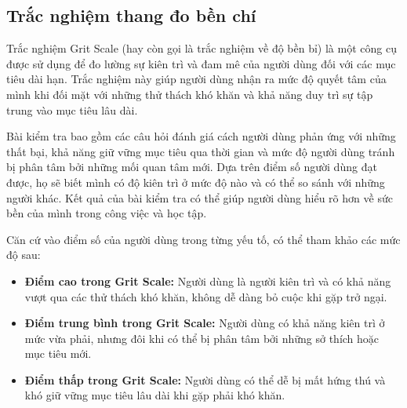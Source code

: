 \subsection{Trắc nghiệm thang đo bền chí}

Trắc nghiệm Grit Scale (hay còn gọi là trắc nghiệm về độ bền bỉ) là một công cụ được sử dụng để đo lường sự kiên trì và đam mê của người dùng đối với các mục tiêu dài hạn. Trắc nghiệm này giúp người dùng nhận ra mức độ quyết tâm của mình khi đối mặt với những thử thách khó khăn và khả năng duy trì sự tập trung vào mục tiêu lâu dài.

Bài kiểm tra bao gồm các câu hỏi đánh giá cách người dùng phản ứng với những thất bại, khả năng giữ vững mục tiêu qua thời gian và mức độ người dùng tránh bị phân tâm bởi những mối quan tâm mới. Dựa trên điểm số người dùng đạt được, họ sẽ biết mình có độ kiên trì ở mức độ nào và có thể so sánh với những người khác. Kết quả của bài kiểm tra có thể giúp người dùng hiểu rõ hơn về sức bền của mình trong công việc và học tập.

Căn cứ vào điểm số của người dùng trong từng yếu tố, có thể tham khảo các mức độ sau:

\begin{itemize}
    \item \textbf{Điểm cao trong Grit Scale:} Người dùng là người kiên trì và có khả năng vượt qua các thử thách khó khăn, không dễ dàng bỏ cuộc khi gặp trở ngại.
    \item \textbf{Điểm trung bình trong Grit Scale:} Người dùng có khả năng kiên trì ở mức vừa phải, nhưng đôi khi có thể bị phân tâm bởi những sở thích hoặc mục tiêu mới.
    \item \textbf{Điểm thấp trong Grit Scale:} Người dùng có thể dễ bị mất hứng thú và khó giữ vững mục tiêu lâu dài khi gặp phải khó khăn.
\end{itemize}

